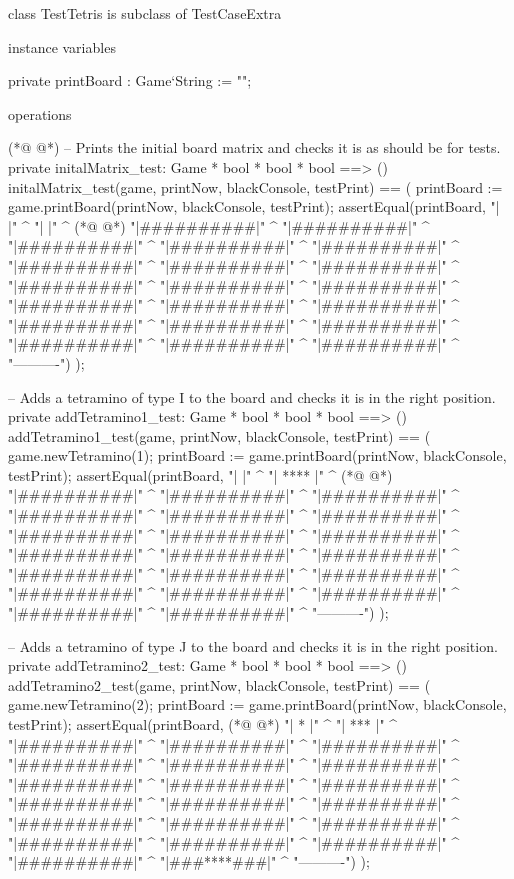 \begin{vdmpp}[breaklines=true]
class TestTetris is subclass of TestCaseExtra

 instance variables
 
  private printBoard : Game`String := "";
   

 operations
 
(*@
\label{print:test:10}
@*)
  -- Prints the initial board matrix and checks it is as should be for tests.
  private initalMatrix_test: Game * bool * bool * bool ==> ()
  initalMatrix_test(game, printNow, blackConsole, testPrint) == (
   printBoard := game.printBoard(printNow, blackConsole, testPrint);
   assertEqual(printBoard, 
    "\n|          |" ^
    "\n|          |" ^
(*@
\label{initalMatrix:test:17}
@*)
    "\n|##########|" ^
    "\n|##########|" ^
    "\n|##########|" ^
    "\n|##########|" ^
    "\n|##########|" ^
    "\n|##########|" ^
    "\n|##########|" ^
    "\n|##########|" ^
    "\n|##########|" ^
    "\n|##########|" ^
    "\n|##########|" ^
    "\n|##########|" ^
    "\n|##########|" ^
    "\n|##########|" ^
    "\n|##########|" ^
    "\n|##########|" ^
    "\n|##########|" ^
    "\n|##########|" ^
    "\n|##########|" ^
    "\n|##########|" ^
    "\n ----------")
  ); 

  -- Adds a tetramino of type I to the board and checks it is in the right position.
  private addTetramino1_test: Game * bool * bool * bool ==> ()
  addTetramino1_test(game, printNow, blackConsole, testPrint) == (  
   game.newTetramino(1);
   printBoard := game.printBoard(printNow, blackConsole, testPrint);
   assertEqual(printBoard, 
    "\n|          |" ^
    "\n|   ****   |" ^
(*@
\label{addTetramino1:test:48}
@*)
    "\n|##########|" ^
    "\n|##########|" ^
    "\n|##########|" ^
    "\n|##########|" ^
    "\n|##########|" ^
    "\n|##########|" ^
    "\n|##########|" ^
    "\n|##########|" ^
    "\n|##########|" ^
    "\n|##########|" ^
    "\n|##########|" ^
    "\n|##########|" ^
    "\n|##########|" ^
    "\n|##########|" ^
    "\n|##########|" ^
    "\n|##########|" ^
    "\n|##########|" ^
    "\n|##########|" ^
    "\n|##########|" ^
    "\n|##########|" ^
    "\n ----------")
  );

  -- Adds a tetramino of type J to the board and checks it is in the right position.
  private addTetramino2_test: Game * bool * bool * bool ==> ()
  addTetramino2_test(game, printNow, blackConsole, testPrint) == (  
   game.newTetramino(2);
   printBoard := game.printBoard(printNow, blackConsole, testPrint);
   assertEqual(printBoard, 
(*@
\label{addTetramino2:test:77}
@*)
    "\n|   *      |" ^
    "\n|   ***    |" ^
    "\n|##########|" ^
    "\n|##########|" ^
    "\n|##########|" ^
    "\n|##########|" ^
    "\n|##########|" ^
    "\n|##########|" ^
    "\n|##########|" ^
    "\n|##########|" ^
    "\n|##########|" ^
    "\n|##########|" ^
    "\n|##########|" ^
    "\n|##########|" ^
    "\n|##########|" ^
    "\n|##########|" ^
    "\n|##########|" ^
    "\n|##########|" ^
    "\n|##########|" ^
    "\n|##########|" ^
    "\n|##########|" ^
    "\n|###****###|" ^
    "\n ----------")
  );


\end{vdmpp}

